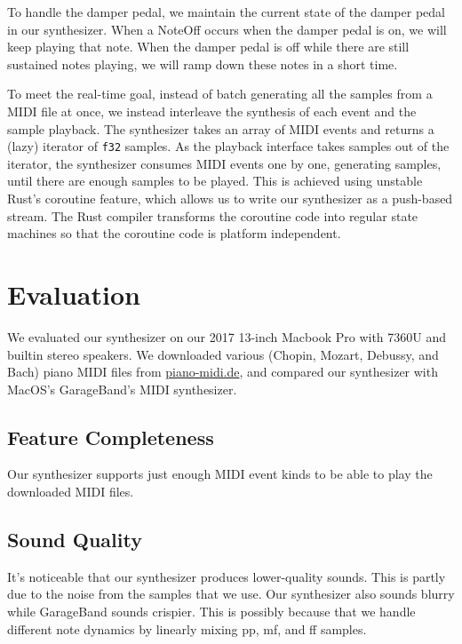 \documentclass{article}
\begin{document}
To handle the damper pedal, we maintain the current state of the damper
pedal in our synthesizer. When a NoteOff occurs when the damper pedal
is on, we will keep playing that note. When the damper pedal is off while
there are still sustained notes playing, we will ramp down these notes in
a short time.

To meet the real-time goal, instead of batch generating all the samples
from a MIDI file at once, we instead interleave the synthesis of each event
and the sample playback. The synthesizer takes an array of MIDI events
and returns a (lazy) iterator of \texttt{f32} samples. As the playback
interface takes samples out of the iterator, the synthesizer consumes MIDI
events one by one, generating samples, until there are enough
samples to be played. This is achieved using unstable Rust's coroutine
feature, which allows us to write our synthesizer as a push-based stream.
The Rust compiler transforms the coroutine code into regular state machines
so that the coroutine code is platform independent.

\section{Evaluation}

We evaluated our synthesizer on our 2017 13-inch Macbook Pro with
7360U and builtin stereo speakers. We downloaded various
(Chopin, Mozart, Debussy, and Bach) piano MIDI files
from \href{http://www.piano-midi.de/}{piano-midi.de}, and compared our
synthesizer with MacOS's GarageBand's MIDI synthesizer.

\subsection{Feature Completeness}

Our synthesizer supports just enough MIDI event kinds to be able to play
the downloaded MIDI files.

\subsection{Sound Quality}

It's noticeable that our synthesizer produces lower-quality sounds. This
is partly due to the noise from the samples that we use. Our synthesizer
also sounds blurry while GarageBand sounds crispier. This is possibly
because that we handle different note dynamics by linearly mixing pp,
mf, and ff samples.
\end{document}
